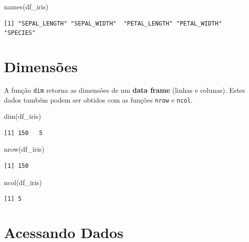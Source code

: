 \documentclass[
  letterpaper,
  DIV=11,
  numbers=noendperiod]{scrreprt}
\newenvironment{Shaded}{\begin{snugshade}}{\end{snugshade}}
\newcommand{\FunctionTok}[1]{\textcolor[rgb]{0.28,0.35,0.67}{#1}}
\newcommand{\NormalTok}[1]{\textcolor[rgb]{0.00,0.23,0.31}{#1}}
\begin{document}
\begin{Shaded}
\begin{Highlighting}[]
\FunctionTok{names}\NormalTok{(df\_iris)}
\end{Highlighting}
\end{Shaded}

\begin{verbatim}
[1] "SEPAL_LENGTH" "SEPAL_WIDTH"  "PETAL_LENGTH" "PETAL_WIDTH"  "SPECIES"     
\end{verbatim}

\hypertarget{dimensuxf5es}{%
\section{Dimensões}\label{dimensuxf5es}}

A função \texttt{dim} retorna as dimensões de um \textbf{data frame}
(linhas e colunas). Estes dados também podem ser obtidos com as funções
\texttt{nrow} e \texttt{ncol}.

\begin{Shaded}
\begin{Highlighting}[]
\FunctionTok{dim}\NormalTok{(df\_iris)}
\end{Highlighting}
\end{Shaded}

\begin{verbatim}
[1] 150   5
\end{verbatim}

\begin{Shaded}
\begin{Highlighting}[]
\FunctionTok{nrow}\NormalTok{(df\_iris)}
\end{Highlighting}
\end{Shaded}

\begin{verbatim}
[1] 150
\end{verbatim}

\begin{Shaded}
\begin{Highlighting}[]
\FunctionTok{ncol}\NormalTok{(df\_iris)}
\end{Highlighting}
\end{Shaded}

\begin{verbatim}
[1] 5
\end{verbatim}

\hypertarget{acessando-dados}{%
\section{Acessando Dados}\label{acessando-dados}}
\end{document}
